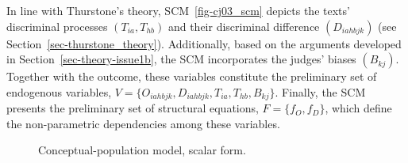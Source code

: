 \documentclass[
  authoryear,
  review,
  1p]{elsarticle}
\begin{document}
In line with Thurstone's theory, SCM~\ref{fig-cj03_scm} depicts the
texts' discriminal processes \((T_{ia}, T_{hb})\) and their discriminal
difference \((D_{iahbjk})\) (see Section~\ref{sec-thurstone_theory}).
Additionally, based on the arguments developed in
Section~\ref{sec-theory-issue1b}, the SCM incorporates the judges'
biases \((B_{kj})\). Together with the outcome, these variables
constitute the preliminary set of endogenous variables,
\(V = \{ O_{iahbjk}, D_{iahbjk}, T_{ia}, T_{hb}, B_{kj} \}\). Finally,
the SCM presents the preliminary set of structural equations,
\(F = \{ f_{O}, f_{D} \}\), which define the non-parametric dependencies
among these variables.

\begin{figure}[H]

\begin{minipage}{\linewidth}

\centering{

\[
\begin{aligned}
  O^{cp}_{iahbjk} & := f_{O}(D_{iahbjk}) \\
  D_{iahbjk} & := f_{D}(T_{ia}, T_{hb}, B_{jk})
\end{aligned}
\]

}


\end{minipage}%
\newline
\begin{minipage}{\linewidth}



\end{minipage}%

\caption{\label{fig-cj03}Conceptual-population model, scalar form.}

\end{figure}%
\end{document}
